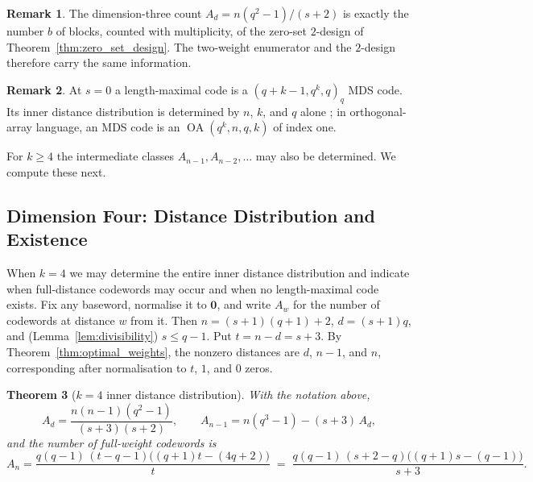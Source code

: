 \documentclass[12pt, letterpaper]{article}
\theoremstyle{plain}
\newtheorem{theorem}{Theorem}[section]
\theoremstyle{definition}
\newtheorem{remark}[theorem]{Remark}
\begin{document}
	\begin{remark}
		The dimension-three count $A_d = n(q^2-1)/(s+2)$ is exactly the number $b$ of blocks, counted with multiplicity, of the zero-set $2$-design of Theorem~\ref{thm:zero_set_design}. The two-weight enumerator and the $2$-design therefore carry the same information.
	\end{remark}

	\begin{remark}\label{rem:s0_mds}
		At $s=0$ a length-maximal code is a $(q+k-1,q^k,q)_q$ MDS code. Its inner distance distribution is determined by $n$, $k$, and $q$ alone \cite{Bush1952,Alderson2005Extending,Alderson2020}; in orthogonal-array language, an MDS code is an $\operatorname{OA}(q^k,n,q,k)$ of index one.
	\end{remark}

	For $k \ge 4$ the intermediate classes $A_{n-1}, A_{n-2}, \dots$ may also be determined. We compute these next.

	\subsection{Dimension Four: Distance Distribution and Existence}
	\label{sec:dim4}

	When $k=4$ we may determine the entire inner distance distribution and indicate when full-distance codewords may occur and when no length-maximal code exists. Fix any baseword, normalise it to $\mathbf0$, and write $A_w$ for the number of codewords at distance $w$ from it. Then $n=(s+1)(q+1)+2$, $d=(s+1)q$, and (Lemma~\ref{lem:divisibility}) $s\le q-1$. Put $t=n-d=s+3$. By Theorem~\ref{thm:optimal_weights}, the nonzero distances are $d$, $n-1$, and $n$, corresponding after normalisation to $t$, $1$, and $0$ zeros.

	\begin{theorem}[$k=4$ inner distance distribution]\label{thm:dim4_enumerator}
		With the notation above,
		\[
		A_d = \frac{n(n-1)(q^2-1)}{(s+3)(s+2)}, \qquad A_{n-1} = n(q^3-1) - (s+3)\,A_d,
		\]
		and the number of full-weight codewords is
		\[
		A_n = \frac{q(q-1)\,(t-q-1)\bigl((q+1)t-(4q+2)\bigr)}{t} \;=\; \frac{q(q-1)\,(s+2-q)\bigl((q+1)s-(q-1)\bigr)}{s+3}.
		\]
	\end{theorem}
\end{document}
